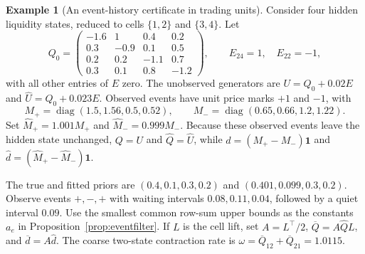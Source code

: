 \documentclass[11pt]{article}
\theoremstyle{plain}
\theoremstyle{definition}
\newtheorem{example}[theorem]{Example}
\theoremstyle{remark}
\begin{document}
\begin{example}[An event-history certificate in trading units]
\label{ex:completebook}
Consider four hidden liquidity states, reduced to cells
\(\{1,2\}\) and \(\{3,4\}\). Let
\[
 Q_0=\begin{pmatrix}
 -1.6&1&0.4&0.2\\
 0.3&-0.9&0.1&0.5\\
 0.2&0.2&-1.1&0.7\\
 0.3&0.1&0.8&-1.2
 \end{pmatrix},
 \qquad E_{24}=1,\quad E_{22}=-1,
\]
with all other entries of \(E\) zero. The unobserved generators are
\(U=Q_0+0.02E\) and \(\widehat U=Q_0+0.023E\).
Observed events have unit price marks \(+1\) and \(-1\), with
\[
 M_+=\operatorname{diag}(1.5,1.56,0.5,0.52),\qquad
 M_-=\operatorname{diag}(0.65,0.66,1.2,1.22).
\]
Set \(\widehat M_+=1.001M_+\) and
\(\widehat M_-=0.999M_-\). Because these observed events leave the
hidden state unchanged, \(Q=U\) and \(\widehat Q=\widehat U\),
while \(d=(M_+-M_-)\mathbf1\) and
\(\widehat d=(\widehat M_+-\widehat M_-)\mathbf1\).

The true and fitted priors are \((0.4,0.1,0.3,0.2)\) and
\((0.401,0.099,0.3,0.2)\). Observe events \(+,-,+\) with waiting
intervals \(0.08,0.11,0.04\), followed by a quiet interval \(0.09\).
Use the smallest common row-sum upper bounds as the constants
\(a_e\) in Proposition~\ref{prop:eventfilter}. If \(L\) is the cell
lift, set \(A=L^\top/2\),
\(\overline Q=A\widehat QL\), and
\(\overline d=A\widehat d\). The coarse two-state contraction rate
is \(\omega=\overline Q_{12}+\overline Q_{21}=1.0115\).


\end{example}
\end{document}
